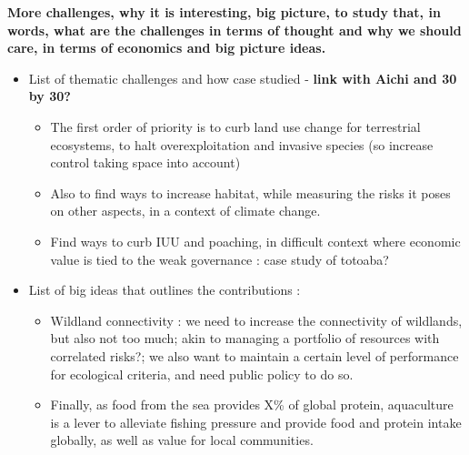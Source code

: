 \textbf{More challenges, why it is interesting, big picture, to study that, in words, what are the challenges in terms of thought and why we should care, in terms of economics and big picture ideas.}



\begin{itemize}
\item List of thematic challenges and how case studied - \textbf{link with Aichi and 30 by 30?}
\begin{itemize}
\item The first order of priority is to curb land use change for terrestrial ecosystems, to halt overexploitation and invasive species (so increase control taking space into account)
\item Also to find ways to increase habitat, while measuring the risks it poses on other aspects, in a context of climate change. 
\item Find ways to curb IUU and poaching, in difficult context where economic value is tied to the weak governance : case study of totoaba? 
\end{itemize}
\item List of big ideas that outlines the contributions : 
\begin{itemize}
\item Wildland connectivity : we need to increase the connectivity of wildlands, but also not too much; akin to managing a portfolio of resources with correlated risks?; we also want to maintain a certain level of performance for ecological criteria, and need public policy to do so.
\item Finally, as food from the sea provides X\% of global protein, aquaculture is a lever to alleviate fishing pressure and provide food and protein intake globally, as well as value for local communities. 
\end{itemize}
\end{itemize}

